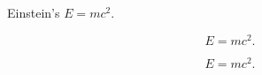 \documentclass{article}
\begin{document}
Einstein's  $E=mc^2$.

\[ E=mc^2. \]

\begin{equation}
    E=mc^2.
\end{equation}
\end{document}
